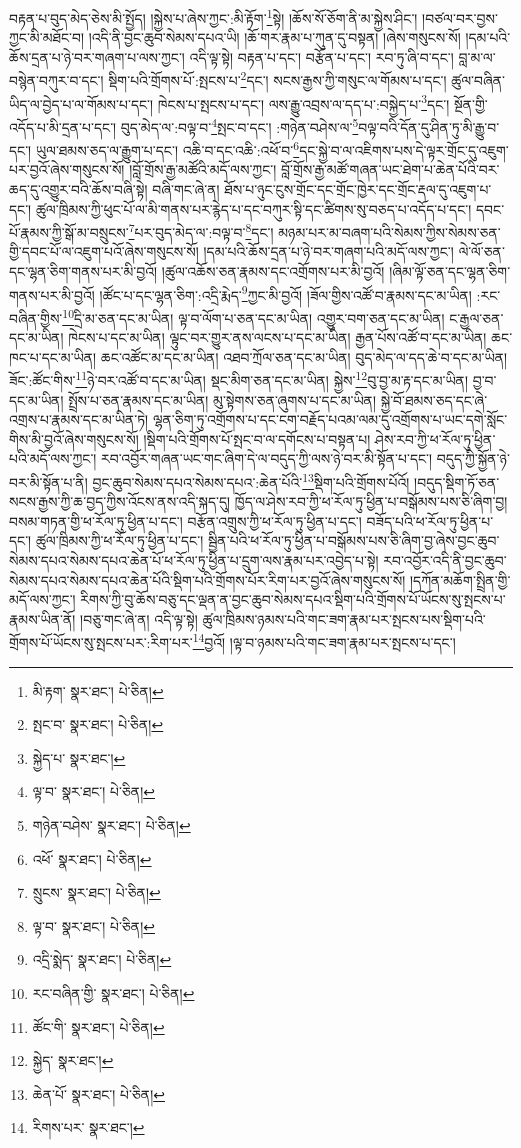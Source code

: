 བརྟན་པ་བུད་མེད་ཅེས་མི་སྤྱོད། །སྐྱེས་པ་ཞེས་ཀྱང་:མི་རྟོག་\footnote{མི་རྟག་  སྣར་ཐང་།  པེ་ཅིན། }སྟེ། །ཆོས་སོ་ཅོག་ནི་མ་སྐྱེས་ཤིང་། །བཙལ་བར་བྱས་ཀྱང་མི་མཐོང་བ། །འདི་ནི་བྱང་ཆུབ་སེམས་དཔའ་ཡི། །ཆོ་གར་རྣམ་པ་ཀུན་དུ་བསྟན། །ཞེས་གསུངས་སོ། །དམ་པའི་ཆོས་དྲན་པ་ཉེ་བར་གཞག་པ་ལས་ཀྱང་། འདི་ལྟ་སྟེ། བརྟན་པ་དང་། བརྩོན་པ་དང་། རབ་ཏུ་ཞི་བ་དང་། བླ་མ་ལ་བསྙེན་བཀུར་བ་དང་། སྡིག་པའི་གྲོགས་པོ་:སྤངས་པ་\footnote{སྤང་བ་  སྣར་ཐང་།  པེ་ཅིན། }དང་། སངས་རྒྱས་ཀྱི་གསུང་ལ་གོམས་པ་དང་། ཚུལ་བཞིན་ཡིད་ལ་བྱེད་པ་ལ་གོམས་པ་དང་། ཁེངས་པ་སྤངས་པ་དང་། ལས་རྒྱུ་འབྲས་ལ་དད་པ་:བསྐྱེད་པ་\footnote{སྐྱེད་པ་  སྣར་ཐང་། }དང་། སྔོན་གྱི་འདོད་པ་མི་དྲན་པ་དང་། བུད་མེད་ལ་:བལྟ་བ་\footnote{ལྟ་བ་  སྣར་ཐང་།  པེ་ཅིན། }སྤང་བ་དང་། :གཉེན་བཤེས་ལ་\footnote{གཉེན་བཤེས་  སྣར་ཐང་།  པེ་ཅིན། }བལྟ་བའི་དོན་དུ་ཤིན་ཏུ་མི་རྒྱུ་བ་དང་། ཡུལ་ཐམས་ཅད་ལ་རྒྱུག་པ་དང་། འཆི་བ་དང་འཆི་:འཕོ་བ་\footnote{འཕོ་  སྣར་ཐང་།  པེ་ཅིན། }དང་སྐྱེ་བ་ལ་འཇིགས་པས་དེ་ལྟར་གྲོང་དུ་འཇུག་པར་བྱའོ་ཞེས་གསུངས་སོ། །བློ་གྲོས་རྒྱ་མཚོའི་མདོ་ལས་ཀྱང་། བློ་གྲོས་རྒྱ་མཚོ་གཞན་ཡང་ཐེག་པ་ཆེན་པོའི་བར་ཆད་དུ་འགྱུར་བའི་ཆོས་བཞི་སྟེ། བཞི་གང་ཞེ་ན། ཐོས་པ་ཉུང་ངུས་གྲོང་དང་གྲོང་ཁྱེར་དང་གྲོང་རྡལ་དུ་འཇུག་པ་དང་། ཚུལ་ཁྲིམས་ཀྱི་ཕུང་པོ་ལ་མི་གནས་པར་རྙེད་པ་དང་བཀུར་སྟི་དང་ཚིགས་སུ་བཅད་པ་འདོད་པ་དང་། དབང་པོ་རྣམས་ཀྱི་སྒོ་མ་བསྲུངས་\footnote{སྲུངས་  སྣར་ཐང་།  པེ་ཅིན། }པར་བུད་མེད་ལ་:བལྟ་བ་\footnote{ལྟ་བ་  སྣར་ཐང་།  པེ་ཅིན། }དང་། མཉམ་པར་མ་བཞག་པའི་སེམས་ཀྱིས་སེམས་ཅན་གྱི་དབང་པོ་ལ་འཇུག་པའོ་ཞེས་གསུངས་སོ། །དམ་པའི་ཆོས་དྲན་པ་ཉེ་བར་གཞག་པའི་མདོ་ལས་ཀྱང་། ལེ་ལོ་ཅན་དང་ལྷན་ཅིག་གནས་པར་མི་བྱའོ། །ཚུལ་འཆོས་ཅན་རྣམས་དང་འགྲོགས་པར་མི་བྱའོ། །ཞིམ་ལྟོ་ཅན་དང་ལྷན་ཅིག་གནས་པར་མི་བྱའོ། །ཚོང་པ་དང་ལྷན་ཅིག་:འདྲི་རྨེད་\footnote{འདྲི་སྨེད་  སྣར་ཐང་།  པེ་ཅིན། }ཀྱང་མི་བྱའོ། །ཟོལ་གྱིས་འཚོ་བ་རྣམས་དང་མ་ཡིན། :རང་བཞིན་གྱིས་\footnote{རང་བཞིན་གྱི་  སྣར་ཐང་།  པེ་ཅིན། }དྲི་མ་ཅན་དང་མ་ཡིན། ལྟ་བ་ལོག་པ་ཅན་དང་མ་ཡིན། འགྱུར་བག་ཅན་དང་མ་ཡིན། ང་རྒྱལ་ཅན་དང་མ་ཡིན། ཁེངས་པ་དང་མ་ཡིན། ལྟུང་བར་གྱུར་ནས་ལངས་པ་དང་མ་ཡིན། རྒྱན་པོས་འཚོ་བ་དང་མ་ཡིན། ཆང་ཁང་པ་དང་མ་ཡིན། ཆང་འཚོང་མ་དང་མ་ཡིན། འཐབ་ཀྲོལ་ཅན་དང་མ་ཡིན། བུད་མེད་ལ་དད་ཆེ་བ་དང་མ་ཡིན། ཟོང་:ཚོང་གིས་\footnote{ཚོང་གི་  སྣར་ཐང་།  པེ་ཅིན། }ཉེ་བར་འཚོ་བ་དང་མ་ཡིན། སྡང་མིག་ཅན་དང་མ་ཡིན། སྐྱེས་\footnote{སྐྱེད་  སྣར་ཐང་། }བུ་བྱ་མ་རྟ་དང་མ་ཡིན། བྱ་བ་དང་མ་ཡིན། སྤྲོས་པ་ཅན་རྣམས་དང་མ་ཡིན། མུ་སྟེགས་ཅན་ཞུགས་པ་དང་མ་ཡིན། སྐྱེ་བོ་ཐམས་ཅད་དང་ཞེ་འགྲས་པ་རྣམས་དང་མ་ཡིན་ཏེ། ལྷན་ཅིག་ཏུ་འགྲོགས་པ་དང་ངག་བརྗོད་པའམ་ལམ་དུ་འགྲོགས་པ་ཡང་དགེ་སློང་གིས་མི་བྱའོ་ཞེས་གསུངས་སོ། །སྡིག་པའི་གྲོགས་པོ་སྤང་བ་ལ་དགོངས་པ་བསྟན་པ། ཤེས་རབ་ཀྱི་ཕ་རོལ་ཏུ་ཕྱིན་པའི་མདོ་ལས་ཀྱང་། རབ་འབྱོར་གཞན་ཡང་གང་ཞིག་དེ་ལ་བདུད་ཀྱི་ལས་ཉེ་བར་མི་སྟོན་པ་དང་། བདུད་ཀྱི་སྐྱོན་ཉེ་བར་མི་སྟོན་པ་ནི། བྱང་ཆུབ་སེམས་དཔའ་སེམས་དཔའ་:ཆེན་པོའི་\footnote{ཆེན་པོ་  སྣར་ཐང་།  པེ་ཅིན། }སྡིག་པའི་གྲོགས་པོའོ། །བདུད་སྡིག་ཏོ་ཅན་སངས་རྒྱས་ཀྱི་ཆ་བྱད་ཀྱིས་འོངས་ནས་འདི་སྐད་དུ། ཁྱོད་ལ་ཤེས་རབ་ཀྱི་ཕ་རོལ་ཏུ་ཕྱིན་པ་བསྒོམས་པས་ཅི་ཞིག་བྱ། བསམ་གཏན་གྱི་ཕ་རོལ་ཏུ་ཕྱིན་པ་དང་། བརྩོན་འགྲུས་ཀྱི་ཕ་རོལ་ཏུ་ཕྱིན་པ་དང་། བཟོད་པའི་ཕ་རོལ་ཏུ་ཕྱིན་པ་དང་། ཚུལ་ཁྲིམས་ཀྱི་ཕ་རོལ་ཏུ་ཕྱིན་པ་དང་། སྦྱིན་པའི་ཕ་རོལ་ཏུ་ཕྱིན་པ་བསྒོམས་པས་ཅི་ཞིག་བྱ་ཞེས་བྱང་ཆུབ་སེམས་དཔའ་སེམས་དཔའ་ཆེན་པོ་ཕ་རོལ་ཏུ་ཕྱིན་པ་དྲུག་ལས་རྣམ་པར་འབྱེད་པ་སྟེ། རབ་འབྱོར་འདི་ནི་བྱང་ཆུབ་སེམས་དཔའ་སེམས་དཔའ་ཆེན་པོའི་སྡིག་པའི་གྲོགས་པོར་རིག་པར་བྱའོ་ཞེས་གསུངས་སོ། །དཀོན་མཆོག་སྤྲིན་གྱི་མདོ་ལས་ཀྱང་། རིགས་ཀྱི་བུ་ཆོས་བཅུ་དང་ལྡན་ན་བྱང་ཆུབ་སེམས་དཔའ་སྡིག་པའི་གྲོགས་པོ་ཡོངས་སུ་སྤངས་པ་རྣམས་ཡིན་ནོ། །བཅུ་གང་ཞེ་ན། འདི་ལྟ་སྟེ། ཚུལ་ཁྲིམས་ཉམས་པའི་གང་ཟག་རྣམ་པར་སྤངས་པས་སྡིག་པའི་གྲོགས་པོ་ཡོངས་སུ་སྤངས་པར་:རིག་པར་\footnote{རིགས་པར་  སྣར་ཐང་། }བྱའོ། །ལྟ་བ་ཉམས་པའི་གང་ཟག་རྣམ་པར་སྤངས་པ་དང་། 
